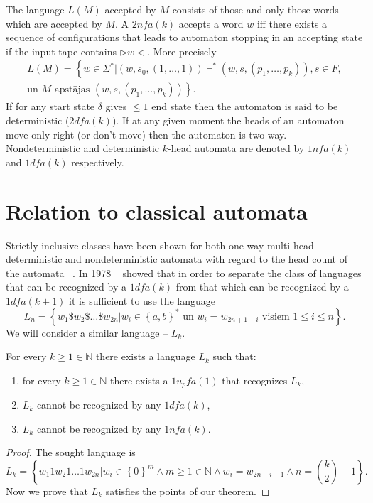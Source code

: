 \documentclass{llncs}
\begin{document}
\begin{definicija}
The language $L(M)$ accepted by $M$ consists of those and only those words which are accepted by $M$. A $2nfa(k)$ accepts a word $w$ iff there exists a sequence of configurations that leads to automaton stopping in an accepting state if the input tape contains
$\triangleright w \triangleleft$. More precisely -- 
\begin{multline*}
	L(M)=\left\{ w \in \Sigma^* | \left(w,s_0,\left(1,\ldots,1\right)\right) \vdash^* \left(w,s,\left(p_1,\ldots,p_k\right)\right), s \in F,\right.\\
	\left.\textrm{un } M \textrm{ apstājas } \left(w,s,\left(p_1,\ldots,p_k\right)\right)\right\}.
\end{multline*}
If for any start state $\delta$ gives $\leq 1$ end state %
then the automaton is said to be deterministic ($2dfa(k)$). If at any given moment the heads of an automaton move only right (or don't move) then the automaton is two-way. Nondeterministic and deterministic $k$-head automata are denoted by $1nfa(k)$ and $1dfa(k)$ respectively.


\section{Relation to classical automata}
Strictly inclusive classes have been shown for both one-way multi-head deterministic and nondeterministic automata with regard to the head count of the automata ~\citep{Holzer2009,Yao1978}. In 1978 ~\citet{Yao1978} showed that in order to separate the class of languages that can be recognized by a $1dfa(k)$ from that which can be recognized by a $1dfa(k+1)$ it is sufficient to use the language
\[
	L_n = \left\{w_1\$w_2\$ \ldots \$w_{2n} | w_i \in \left\{a,b\right\}^* \textrm{ un } w_i = w_{2n+1−i} \textrm{ visiem } 1 \leq i \leq n \right\}.
\]
We will consider a similar language -- $L_k$.
\begin{theorem}
For every $k \geq 1 \in \mathbb{N}$ there exists a language $L_k$ such that:
\begin{enumerate}[label={(\arabic*)}]
	\item for every $k \geq 1 \in \mathbb{N}$ there exists a $1u_pfa(1)$ that recognizes $L_k$,
	\item $L_k$ cannot be recognized by any $1dfa(k)$,
	\item $L_k$ cannot be recognized by any $1nfa(k)$.
\end{enumerate}
\end{theorem}
\begin{proof} The sought language is
\[
L_k = \left\{ w_1 1 w_2 1 \ldots 1 w_{2n} |
		w_i \in \left\{ 0 \right\}^m \wedge
		m \geq 1 \in \mathbb{N} \wedge
		w_i = w_{2n-i+1} \wedge
		n={k\choose 2}+1 \right\}.
\]
Now we prove that $L_k$ satisfies the points of our theorem.


\end{proof}
\end{definicija}
\end{document}
